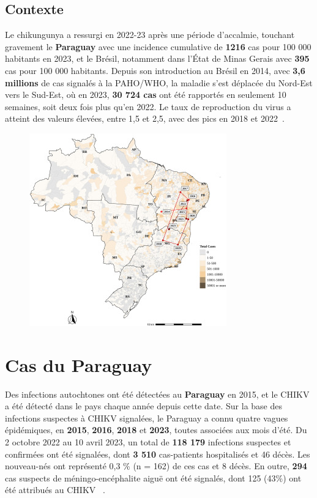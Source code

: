 \subsection{Contexte}
Le chikungunya a ressurgi en 2022-23 après une période d'accalmie, touchant gravement le \textbf{Paraguay} avec une incidence cumulative de \textbf{1216} cas pour 100 000 habitants en 2023, et le Brésil, notamment dans l'État de Minas Gerais avec \textbf{395} cas pour 100 000 habitants. Depuis son introduction au Brésil en 2014, avec\textbf{ 3,6 millions} de cas signalés à la PAHO/WHO, la maladie s'est déplacée du Nord-Est vers le Sud-Est, où en 2023, \textbf{30 724 cas} ont été rapportés en seulement 10 semaines, soit deux fois plus qu'en 2022. Le taux de reproduction du virus a atteint des valeurs élevées, entre 1,5 et 2,5, avec des pics en 2018 et 2022~\cite{Ferreira_de_Almeida2023-et}.
\begin{figure}[h!]
	\centering
	\includegraphics[width=0.6\linewidth]{images/map_cases_brazil}
	\caption[Map of the epicenters of chikungunya cases]{}
	\label{fig:mapcasesbrazil}
\end{figure}
\section{Cas du Paraguay}
Des infections autochtones ont été détectées au \textbf{Paraguay} en 2015, et le CHIKV a été détecté dans le pays chaque année depuis cette date. Sur la base des infections suspectes à CHIKV signalées, le Paraguay a connu quatre vagues épidémiques, en \textbf{2015}, \textbf{2016}, \textbf{2018} et \textbf{2023}, toutes associées aux mois d'été. Du 2 octobre 2022 au 10 avril 2023, un total de \textbf{118 179 }infections suspectes et confirmées ont été signalées, dont\textbf{ 3 510 }cas-patients hospitalisés et 46 décès. Les nouveau-nés ont représenté 0,3 \% (n = 162) de ces cas et 8 décès. En outre, \textbf{294} cas suspects de méningo-encéphalite aiguë ont été signalés, dont 125 (43\%) ont été attribués au CHIKV ~\cite{giovanetti2023rapid}.
